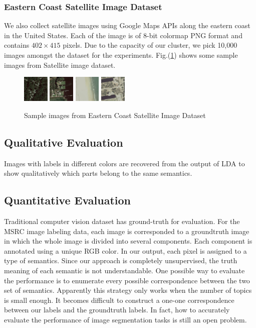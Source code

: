 \documentclass{sig-alternate}
\begin{document}
\subsubsection{Eastern Coast Satellite Image Dataset}
We also collect satellite images using Google Maps APIs along the eastern coast in the United States. Each of the image is of 8-bit colormap PNG format and contains $402\times415$ pixels. Due to the capacity of our cluster, we pick 10,000 images amongst the dataset for the experiments. Fig.(\ref{fig:gmaps}) shows some sample images from Satellite image dataset.
\begin{figure}[!htb]
\centering
\includegraphics[width=0.11\textwidth]{fig/sample-gmaps1}
\includegraphics[width=0.11\textwidth]{fig/sample-gmaps2}
\includegraphics[width=0.11\textwidth]{fig/sample-gmaps3}
\includegraphics[width=0.11\textwidth]{fig/sample-gmaps4}
\caption{Sample images from Eastern Coast Satellite Image Dataset}\label{fig:gmaps}
\end{figure}

\subsection{Qualitative Evaluation}
Images with labels in different colors are recovered from the output of LDA to show qualitatively which parts belong to the same semantics.
\subsection{Quantitative Evaluation}
Traditional computer vision dataset has ground-truth for evaluation. For the MSRC image labeling data, each image is corresponded to a groundtruth image in which the whole image is divided into several components. Each component is annotated using a unique RGB color. In our output, each pixel is assigned to a type of semantics. Since our approach is completely unsupervised, the truth meaning of each semantic is not understandable. One possible way to evaluate the performance is to enumerate every possible correspondence between the two set of semantics. Apparently this strategy only works when the number of topics is small enough. It becomes difficult to construct a one-one correspondence between our labels and the groundtruth labels. In fact, how to accurately evaluate the performance of image segmentation tasks is still an open problem.
\end{document}
